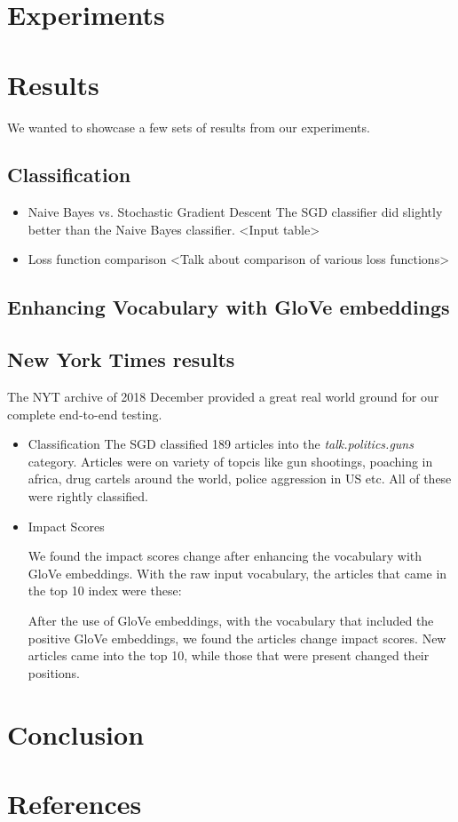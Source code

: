 \documentclass[paper=a4, fontsize=11pt]{scrartcl}
\numberwithin{equation}{section}		%
\numberwithin{figure}{section}			%
\numberwithin{table}{section}				%
\begin{document}
\section{Experiments}

\section{Results}
We wanted to showcase a few sets of results from our experiments.

\subsection {Classification}

\begin {itemize}

\item {Naive Bayes vs. Stochastic Gradient Descent}
The SGD classifier did slightly better than the Naive Bayes classifier. <Input table>

\item {Loss function comparison}
<Talk about comparison of various loss functions>

\end {itemize}

\subsection {Enhancing Vocabulary with GloVe embeddings}

\subsection {New York Times results}

The NYT archive of 2018 December provided a great real world ground for our complete end-to-end testing.

\begin {itemize}
\item {Classification} The SGD classified 189 articles into the \textit{talk.politics.guns} category. Articles were on variety of topcis like gun shootings, poaching in africa, drug cartels around the world, police aggression in US etc. All of these were rightly classified.

\item {Impact Scores}
\par We found the impact scores change after enhancing the vocabulary with GloVe embeddings. With the raw input vocabulary, the articles that came in the top 10 index were these:

\par After the use of GloVe embeddings, with the vocabulary that included the positive GloVe embeddings, we found the articles change impact scores. New articles came into the top 10, while those that were present changed their positions.

\end{itemize}

\section{Conclusion}
\section{References}


\end{document}
